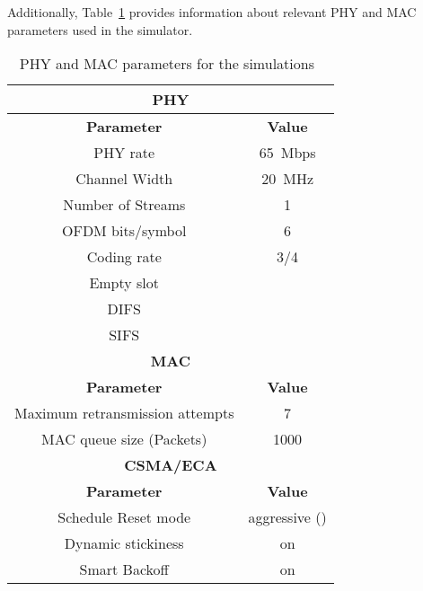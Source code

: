 \documentclass[a4paper]{article}
\begin{document}
Additionally, Table~\ref{tab:mac-params} provides information about relevant PHY and MAC parameters used in the simulator.
	\begin{table}[t]
		\centering
		\caption{PHY and MAC parameters for the simulations~\cite{CSMA-ECA-HEW}}
		\label{tab:mac-params}
		\begin{tabular}{|c|c|}
			\hline
			\multicolumn{2}{|c|}{{\bfseries PHY}}\\
			\hline
			{\bfseries Parameter} & {\bfseries Value}\\
			\hline
			PHY rate & 65~Mbps\\
			Channel Width & 20~MHz\\
			Number of Streams & 1\\
			OFDM bits/symbol & 6\\
			Coding rate & 3/4\\
			Empty slot & \\
			DIFS & \\
			SIFS & \\
			\hline
			\multicolumn{2}{|c|}{{\bfseries MAC}}\\
			\hline
			{\bfseries Parameter} & {\bfseries Value}\\
			\hline
			Maximum retransmission attempts & 7\\
MAC queue size (Packets) & 1000\\
			\hline
			\multicolumn{2}{|c|}{{\bfseries CSMA/ECA}}\\
			\hline
			{\bfseries Parameter} & {\bfseries Value}\\
			\hline
			Schedule Reset mode & aggressive ()\\
			Dynamic stickiness & on\\
			Smart Backoff & on\\
			\hline
		\end{tabular}
	\end{table}
	
\end{document}
